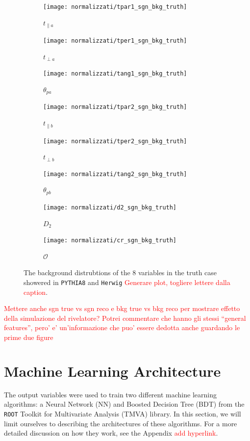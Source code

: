 \documentclass[10pt,a4paper]{book}
\newcommand\todo[1]{\textcolor{red}{#1}}
\def\code#1{\texttt{#1}}
\begin{document}
\begin{figure}
\begin{subfigure}{.33\textwidth}
\centering
\texttt{[image: normalizzati/tpar1\_sgn\_bkg\_truth]}
\caption{$t_{\parallel a}$}
\end{subfigure}
\begin{subfigure}{0.33\textwidth}
\centering
\texttt{[image: normalizzati/tper1\_sgn\_bkg\_truth]}
\caption{$t_{\perp a}$}
\end{subfigure}
\begin{subfigure}{.33\textwidth}
\centering
\texttt{[image: normalizzati/tang1\_sgn\_bkg\_truth]}
\caption{$\theta_{pa}$}
\end{subfigure}
\begin{subfigure}{.33\textwidth}
\centering
\texttt{[image: normalizzati/tpar2\_sgn\_bkg\_truth]}
\caption{$t_{\parallel b}$}
\end{subfigure}
\begin{subfigure}{0.33\textwidth}
\centering
\texttt{[image: normalizzati/tper2\_sgn\_bkg\_truth]}
\caption{$t_{\perp b}$}
\end{subfigure}
\begin{subfigure}{.33\textwidth}
\centering
\texttt{[image: normalizzati/tang2\_sgn\_bkg\_truth]}
\caption{$\theta_{pb}$}
\end{subfigure}
\begin{subfigure}{0.5\textwidth}
\centering
\texttt{[image: normalizzati/d2\_sgn\_bkg\_truth]}
\caption{$D_2$}
\end{subfigure}
\begin{subfigure}{.5\textwidth}
\centering
\texttt{[image: normalizzati/cr\_sgn\_bkg\_truth]}
\caption{$\mathcal{O}$}
\end{subfigure}
\caption{The background distrubtions of the 8 variables in the truth case showered in \code{PYTHIA8} and \code{Herwig} \todo{Generare plot, togliere lettere dalla caption}.}
\label{pythia herwig bkg}
\end{figure}

\todo{Mettere anche sgn true vs sgn reco e bkg true vs bkg reco per mostrare effetto della simulazione del rivelatore? Potrei commentare che hanno gli stessi ``general features'', pero' e' un'informazione che puo' essere dedotta anche guardando le prime due figure}


\section{Machine Learning Architecture}
The output variables were used to train two different machine learning algorithms: a Neural Network (NN) and Boosted Decision Tree (BDT) from the \code{ROOT} Toolkit for Multivariate Analysis (TMVA) library. In this section, we will limit ourselves to describing the architectures of these algorithms. For a more detailed discussion on how they work, see the Appendix \todo{add hyperlink}. 
\end{document}
